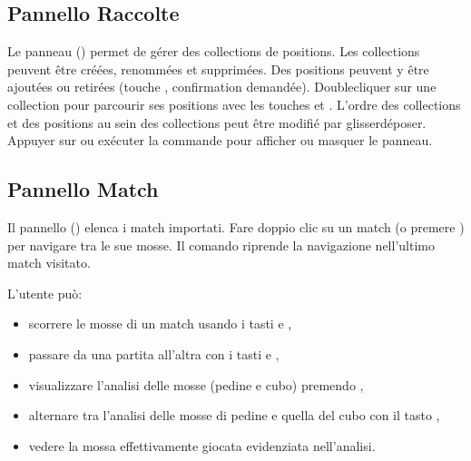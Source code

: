 \documentclass[letterpaper,10pt,italian]{sphinxmanual}
\begin{document}
\subsection{Pannello Raccolte}
\label{\detokenize{manuel:panneau-collections}}\label{\detokenize{manuel:id6}}
\sphinxAtStartPar
Le panneau  () permet de gérer des collections de
positions. Les collections peuvent être créées, renommées et supprimées. Des
positions peuvent y être ajoutées ou retirées (touche , confirmation
demandée). Double\sphinxhyphen{}cliquer sur une collection pour parcourir ses positions
avec les touches  et . L’ordre des collections et des
positions au sein des collections peut être modifié par glisser\sphinxhyphen{}déposer.
Appuyer sur  ou exécuter la commande  pour afficher ou
masquer le panneau.


\subsection{Pannello Match}
\label{\detokenize{manuel:panneau-matchs}}\label{\detokenize{manuel:id7}}
\sphinxAtStartPar
Il pannello  () elenca i match importati. Fare doppio clic su un match (o premere ) per navigare tra le sue mosse. Il comando  riprende la navigazione nell’ultimo match visitato.

\sphinxAtStartPar
L’utente può:
\begin{itemize}
\item {} 
\sphinxAtStartPar
scorrere le mosse di un match usando i tasti  e ,

\item {} 
\sphinxAtStartPar
passare da una partita all’altra con i tasti  e ,

\item {} 
\sphinxAtStartPar
visualizzare l’analisi delle mosse (pedine e cubo) premendo ,

\item {} 
\sphinxAtStartPar
alternare tra l’analisi delle mosse di pedine e quella del cubo con il tasto ,

\item {} 
\sphinxAtStartPar
vedere la mossa effettivamente giocata evidenziata nell’analisi.

\end{itemize}
\end{document}
